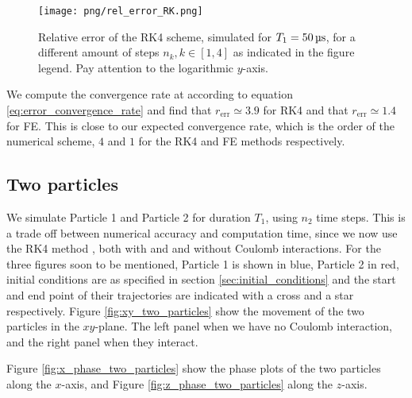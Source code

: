\begin{figure}
    \texttt{[image: png/rel\_error\_RK.png]}
    \caption{Relative error of the RK4 scheme, simulated for $T_1=50\,\mus$, for a different amount of steps $n_k, k\in[1,4]$ as indicated in the figure legend. Pay attention to the logarithmic $y$-axis.}
    \label{fig:error_RK}
\end{figure}




We compute the convergence rate at according to equation \eqref{eq:error_convergence_rate} and find that $r_\mathrm{err}\simeq 3.9 $ for RK4 and that $r_\mathrm{err}\simeq 1.4 $ for FE. This is close to our expected convergence rate, which is the order of the numerical scheme, $4$ and $1$ for the RK4 and FE methods respectively. 


\subsection{Two particles}\label{sec:two_particles}

We simulate Particle 1 and Particle 2 for duration $T_1$,  using $n_2$ time steps. This is a trade off between numerical accuracy and computation time, since we now use the RK4 method , both with and and without Coulomb interactions. For the three figures soon to be mentioned, Particle 1 is shown in blue, Particle 2 in red, initial conditions are as specified in section \ref{sec:initial_conditions} and the start and end point of their trajectories are indicated with a cross and a star respectively. Figure \ref{fig:xy_two_particles} show the movement of the two particles in the $xy$-plane. The left panel when we have no Coulomb interaction, and the right panel when they interact. 

Figure \ref{fig:x_phase_two_particles} show the phase plots of the two particles along the $x$-axis, and Figure \ref{fig:z_phase_two_particles} along the $z$-axis.
\newpage
\onecolumngrid


